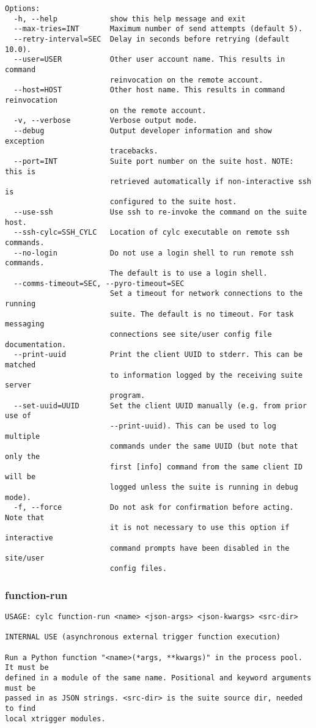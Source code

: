 \begin{lstlisting}
Options:
  -h, --help            show this help message and exit
  --max-tries=INT       Maximum number of send attempts (default 5).
  --retry-interval=SEC  Delay in seconds before retrying (default 10.0).
  --user=USER           Other user account name. This results in command
                        reinvocation on the remote account.
  --host=HOST           Other host name. This results in command reinvocation
                        on the remote account.
  -v, --verbose         Verbose output mode.
  --debug               Output developer information and show exception
                        tracebacks.
  --port=INT            Suite port number on the suite host. NOTE: this is
                        retrieved automatically if non-interactive ssh is
                        configured to the suite host.
  --use-ssh             Use ssh to re-invoke the command on the suite host.
  --ssh-cylc=SSH_CYLC   Location of cylc executable on remote ssh commands.
  --no-login            Do not use a login shell to run remote ssh commands.
                        The default is to use a login shell.
  --comms-timeout=SEC, --pyro-timeout=SEC
                        Set a timeout for network connections to the running
                        suite. The default is no timeout. For task messaging
                        connections see site/user config file documentation.
  --print-uuid          Print the client UUID to stderr. This can be matched
                        to information logged by the receiving suite server
                        program.
  --set-uuid=UUID       Set the client UUID manually (e.g. from prior use of
                        --print-uuid). This can be used to log multiple
                        commands under the same UUID (but note that only the
                        first [info] command from the same client ID will be
                        logged unless the suite is running in debug mode).
  -f, --force           Do not ask for confirmation before acting. Note that
                        it is not necessary to use this option if interactive
                        command prompts have been disabled in the site/user
                        config files.
\end{lstlisting}
\subsubsection{function-run}
\label{function-run}
\begin{lstlisting}
USAGE: cylc function-run <name> <json-args> <json-kwargs> <src-dir>

INTERNAL USE (asynchronous external trigger function execution)

Run a Python function "<name>(*args, **kwargs)" in the process pool. It must be
defined in a module of the same name. Positional and keyword arguments must be
passed in as JSON strings. <src-dir> is the suite source dir, needed to find
local xtrigger modules.
\end{lstlisting}
